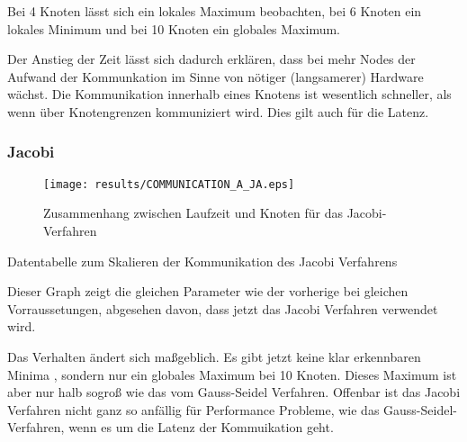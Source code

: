 \documentclass[a4paper,12pt]{scrartcl}
\begin{document}
Bei 4 Knoten lässt sich ein lokales Maximum beobachten, bei 6 Knoten ein lokales Minimum und bei 10 Knoten ein globales Maximum.

Der Anstieg der Zeit lässt sich dadurch erklären, dass bei mehr Nodes der
Aufwand der Kommunkation im Sinne von nötiger (langsamerer) Hardware wächst. Die Kommunikation innerhalb eines Knotens ist wesentlich schneller, als wenn über Knotengrenzen kommuniziert wird.
Dies gilt auch für die Latenz.


\subsubsection{Jacobi}
\begin{figure}[hr!]
\texttt{[image: results/COMMUNICATION\_A\_JA.eps]}
 \caption{Zusammenhang zwischen Laufzeit und Knoten für das Jacobi-Verfahren}
\end{figure}
\begin{table}[hl!]

\caption{Datentabelle zum Skalieren der Kommunikation des Jacobi Verfahrens}
\end{table}

Dieser Graph zeigt die gleichen Parameter wie der vorherige bei gleichen Vorraussetungen, abgesehen davon, dass jetzt das Jacobi Verfahren verwendet wird. 

Das Verhalten ändert sich maßgeblich. Es gibt jetzt keine klar erkennbaren Minima , sondern nur ein globales Maximum bei 10 Knoten. Dieses Maximum ist aber nur halb sogroß wie das vom Gauss-Seidel Verfahren.
Offenbar ist das Jacobi Verfahren nicht ganz so anfällig für Performance Probleme, wie das Gauss-Seidel-Verfahren, wenn es um die Latenz der Kommuikation geht.
\FloatBarrier
\end{document}
